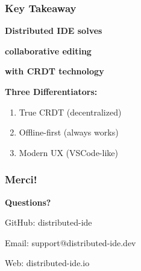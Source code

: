 \documentclass[aspectratio=16:9]{beamer}
\begin{document}
\begin{frame}
  \frametitle{Key Takeaway}
  
  \centering
  
  \Large\vspace{1cm}
  
  \textcolor{DistribIDEBlue}{\textbf{Distributed IDE solves}}
  
  \textcolor{DistribIDEBlue}{\textbf{collaborative editing}}
  
  \textcolor{DistribIDEBlue}{\textbf{with CRDT technology}}
  
  \vspace{1cm}
  
  \normalsize\textbf{Three Differentiators:}
  
  \begin{enumerate}
    \item True CRDT (decentralized)
    \item Offline-first (always works)
    \item Modern UX (VSCode-like)
  \end{enumerate}
\end{frame}

\begin{frame}
  \frametitle{Merci!}
  
  \centering
  \vspace{2cm}
  
  \Large\textcolor{DistribIDEBlue}{\textbf{Questions?}}
  
  \normalsize\vspace{1.5cm}
  
  GitHub: distributed-ide
  
  Email: support@distributed-ide.dev
  
  Web: distributed-ide.io
\end{frame}
\end{document}
